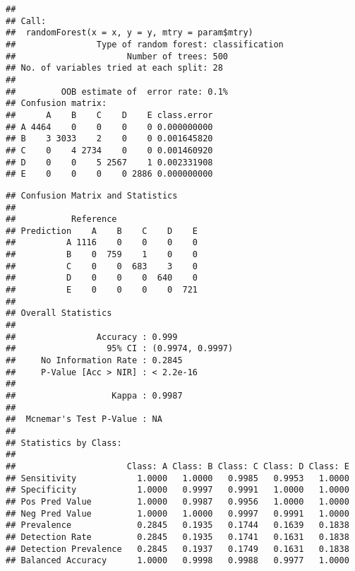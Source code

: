 \documentclass[]{article}
\newenvironment{Shaded}{\begin{snugshade}}{\end{snugshade}}
\newcommand{\KeywordTok}[1]{\textcolor[rgb]{0.13,0.29,0.53}{\textbf{#1}}}
\newcommand{\NormalTok}[1]{#1}
\newcommand{\OperatorTok}[1]{\textcolor[rgb]{0.81,0.36,0.00}{\textbf{#1}}}
\newcommand{\StringTok}[1]{\textcolor[rgb]{0.31,0.60,0.02}{#1}}
\begin{document}
\begin{verbatim}
## 
## Call:
##  randomForest(x = x, y = y, mtry = param$mtry) 
##                Type of random forest: classification
##                      Number of trees: 500
## No. of variables tried at each split: 28
## 
##         OOB estimate of  error rate: 0.1%
## Confusion matrix:
##      A    B    C    D    E class.error
## A 4464    0    0    0    0 0.000000000
## B    3 3033    2    0    0 0.001645820
## C    0    4 2734    0    0 0.001460920
## D    0    0    5 2567    1 0.002331908
## E    0    0    0    0 2886 0.000000000
\end{verbatim}

\begin{Shaded}
\end{Shaded}

\begin{verbatim}
## Confusion Matrix and Statistics
## 
##           Reference
## Prediction    A    B    C    D    E
##          A 1116    0    0    0    0
##          B    0  759    1    0    0
##          C    0    0  683    3    0
##          D    0    0    0  640    0
##          E    0    0    0    0  721
## 
## Overall Statistics
##                                           
##                Accuracy : 0.999           
##                  95% CI : (0.9974, 0.9997)
##     No Information Rate : 0.2845          
##     P-Value [Acc > NIR] : < 2.2e-16       
##                                           
##                   Kappa : 0.9987          
##                                           
##  Mcnemar's Test P-Value : NA              
## 
## Statistics by Class:
## 
##                      Class: A Class: B Class: C Class: D Class: E
## Sensitivity            1.0000   1.0000   0.9985   0.9953   1.0000
## Specificity            1.0000   0.9997   0.9991   1.0000   1.0000
## Pos Pred Value         1.0000   0.9987   0.9956   1.0000   1.0000
## Neg Pred Value         1.0000   1.0000   0.9997   0.9991   1.0000
## Prevalence             0.2845   0.1935   0.1744   0.1639   0.1838
## Detection Rate         0.2845   0.1935   0.1741   0.1631   0.1838
## Detection Prevalence   0.2845   0.1937   0.1749   0.1631   0.1838
## Balanced Accuracy      1.0000   0.9998   0.9988   0.9977   1.0000
\end{verbatim}
\end{document}

